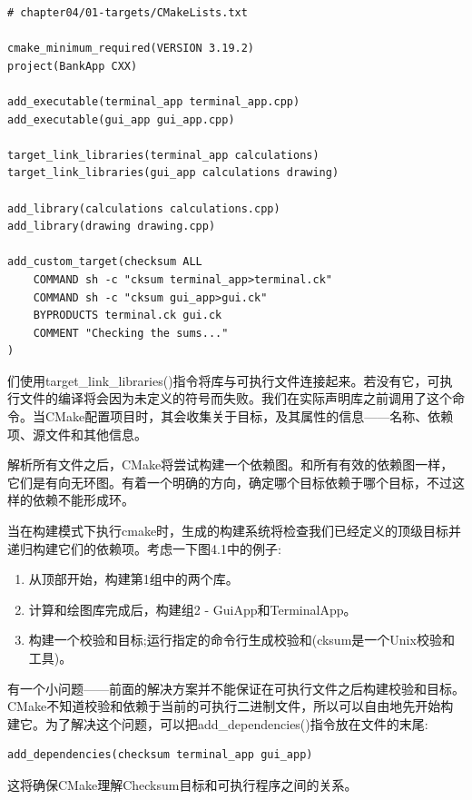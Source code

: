 \begin{lstlisting}[style=styleCMake]
# chapter04/01-targets/CMakeLists.txt

cmake_minimum_required(VERSION 3.19.2)
project(BankApp CXX)

add_executable(terminal_app terminal_app.cpp)
add_executable(gui_app gui_app.cpp)

target_link_libraries(terminal_app calculations)
target_link_libraries(gui_app calculations drawing)

add_library(calculations calculations.cpp)
add_library(drawing drawing.cpp)

add_custom_target(checksum ALL
	COMMAND sh -c "cksum terminal_app>terminal.ck"
	COMMAND sh -c "cksum gui_app>gui.ck"
	BYPRODUCTS terminal.ck gui.ck
	COMMENT "Checking the sums..."
)
\end{lstlisting}

们使用target\_link\_libraries()指令将库与可执行文件连接起来。若没有它，可执行文件的编译将会因为未定义的符号而失败。我们在实际声明库之前调用了这个命令。当CMake配置项目时，其会收集关于目标，及其属性的信息——名称、依赖项、源文件和其他信息。

解析所有文件之后，CMake将尝试构建一个依赖图。和所有有效的依赖图一样，它们是有向无环图。有着一个明确的方向，确定哪个目标依赖于哪个目标，不过这样的依赖不能形成环。

当在构建模式下执行cmake时，生成的构建系统将检查我们已经定义的顶级目标并递归构建它们的依赖项。考虑一下图4.1中的例子:

\begin{enumerate}
\item 
从顶部开始，构建第1组中的两个库。

\item 
计算和绘图库完成后，构建组2 - GuiApp和TerminalApp。

\item 
构建一个校验和目标;运行指定的命令行生成校验和(cksum是一个Unix校验和工具)。
\end{enumerate}

有一个小问题——前面的解决方案并不能保证在可执行文件之后构建校验和目标。CMake不知道校验和依赖于当前的可执行二进制文件，所以可以自由地先开始构建它。为了解决这个问题，可以把add\_dependencies()指令放在文件的末尾:

\begin{lstlisting}[style=styleCMake]
add_dependencies(checksum terminal_app gui_app)
\end{lstlisting}

这将确保CMake理解Checksum目标和可执行程序之间的关系。


